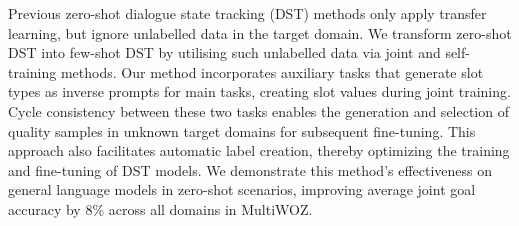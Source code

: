 Previous zero-shot dialogue state tracking (DST) methods only apply transfer learning, but ignore unlabelled data in the target domain. We transform zero-shot DST into few-shot DST by utilising such unlabelled data via joint and self-training methods. Our method incorporates auxiliary tasks that generate slot types as inverse prompts for main tasks, creating slot values during joint training.  Cycle consistency between these two tasks enables the generation and selection of quality samples in unknown target domains for subsequent fine-tuning. This approach also facilitates automatic label creation, thereby optimizing the training and fine-tuning of DST models. We demonstrate this method's effectiveness on general language models in zero-shot scenarios, improving average joint goal accuracy by 8\% across all domains in MultiWOZ.